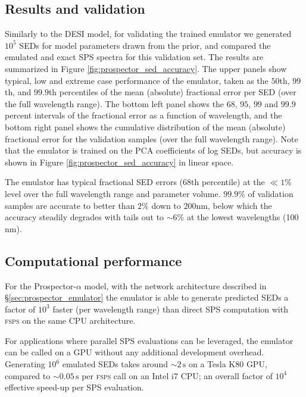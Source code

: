 \documentclass[twocolumn]{aastex62}
\begin{document}
\subsection{Results and validation}
\label{sec:prospector_validation}
Similarly to the DESI model, for validating the trained emulator we generated $10^5$ SEDs for model parameters drawn from the prior, and compared the emulated and exact SPS spectra for this validation set. The results are summarized in Figure \ref{fig:prospector_sed_accuracy}. The upper panels show typical, low and extreme case performance of the emulator, taken as the $50$th, $99$th, and $99.9$th percentiles of the mean (absolute) fractional error per SED (over the full wavelength range). The bottom left panel shows the $68$, $95$, $99$ and $99.9$ percent intervals of the fractional error as a function of wavelength, and the bottom right panel shows the cumulative distribution of the mean (absolute) fractional error for the validation samples (over the full wavelength range). Note that the emulator is trained on the PCA coefficients of log SEDs, but accuracy is shown in Figure \ref{fig:prospector_sed_accuracy} in linear space.

The emulator has typical fractional SED errors (68th percentile) at the $\ll 1\%$ level over the full wavelength range and parameter volume. $99.9\%$ of validation samples are accurate to better than $2\%$ down to $200\mathrm{nm}$, below which the accuracy steadily degrades with tails out to $\sim6\%$ at the lowest wavelengths (100$\mathrm{nm}$).
%
\subsection{Computational performance}
\label{sec:prospector_performance}
%
For the Prospector-$\alpha$ model, with the network architecture described in \S \ref{sec:prospector_emulator} the emulator is able to generate predicted SEDs a factor of $10^3$ faster (per wavelength range) than direct SPS computation with \textsc{fsps} on the same CPU architecture.

For applications where parallel SPS evaluations can be leveraged, the emulator can be called on a GPU without any additional development overhead. Generating $10^6$ emulated SEDs takes around $\sim 2\,\mathrm{s}$ on a Tesla K80 GPU, compared to $\sim 0.05\,\mathrm{s}$  per \textsc{fsps} call on an Intel i7 CPU; an overall factor of $10^4$ effective speed-up per SPS evaluation.
\end{document}
